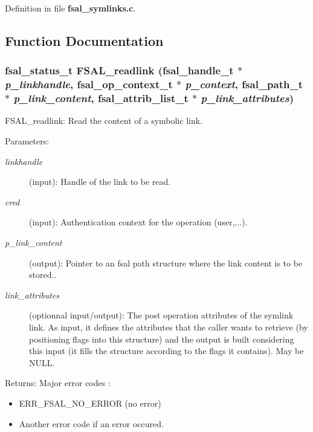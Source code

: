 Definition in file {\bf fsal\_\-symlinks.c}.

\subsection{Function Documentation}
\subsubsection{\setlength{\rightskip}{0pt plus 5cm}fsal\_\-status\_\-t FSAL\_\-readlink (fsal\_\-handle\_\-t $\ast$ {\em p\_\-linkhandle}, fsal\_\-op\_\-context\_\-t $\ast$ {\em p\_\-context}, fsal\_\-path\_\-t $\ast$ {\em p\_\-link\_\-content}, fsal\_\-attrib\_\-list\_\-t $\ast$ {\em p\_\-link\_\-attributes})}\label{fsal__symlinks_8c_a0}


FSAL\_\-readlink: Read the content of a symbolic link.

\begin{Desc}
\item[Parameters:]
\begin{description}
\item[{\em linkhandle}](input): Handle of the link to be read. \item[{\em cred}](input): Authentication context for the operation (user,...). \item[{\em p\_\-link\_\-content}](output): Pointer to an fsal path structure where the link content is to be stored.. \item[{\em link\_\-attributes}](optionnal input/output): The post operation attributes of the symlink link. As input, it defines the attributes that the caller wants to retrieve (by positioning flags into this structure) and the output is built considering this input (it fills the structure according to the flags it contains). May be NULL.\end{description}
\end{Desc}
\begin{Desc}
\item[Returns:]Major error codes :\begin{itemize}
\item ERR\_\-FSAL\_\-NO\_\-ERROR (no error)\item Another error code if an error occured. \end{itemize}
\end{Desc}


